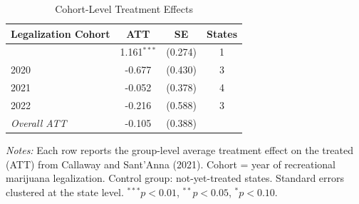 \begin{table}[t]
\centering
\caption{Cohort-Level Treatment Effects}
\label{tab:cohort}
\begin{tabular}{lccc}
\hline\hline
Legalization Cohort & ATT & SE & States \\
\hline
\addlinespace
2019 & 1.161$^{***}$ & (0.274) & 1 \\
2020 & -0.677 & (0.430) & 3 \\
2021 & -0.052 & (0.378) & 4 \\
2022 & -0.216 & (0.588) & 3 \\
\addlinespace
\textit{Overall ATT} & -0.105 & (0.388) & \\
\hline\hline
\end{tabular}
\begin{tablenotes}
\small
\item \textit{Notes:} Each row reports the group-level average treatment effect on the treated (ATT) from Callaway and Sant'Anna (2021). Cohort = year of recreational marijuana legalization. Control group: not-yet-treated states. Standard errors clustered at the state level. $^{***}p<0.01$, $^{**}p<0.05$, $^{*}p<0.10$.
\end{tablenotes}
\end{table}
